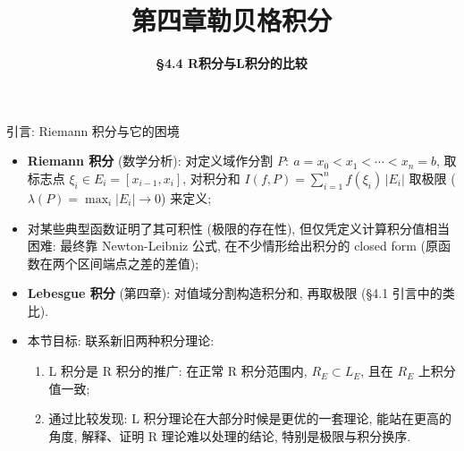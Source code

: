 


\title[第四章\\
勒贝格积分]{\texorpdfstring{\LARGE \bfseries 第四章\quad 勒贝格积分}{第四章 勒贝格积分}} %
\author[\S 4.4\\
R积分与L积分] %
{\Large \bfseries \S 4.4 R积分与L积分的比较}
\date{}





\begin{frame}

\titlepage

\end{frame}




\begin{frame}{引言: Riemann 积分与它的困境}

\begin{itemize}
\item \textbf{Riemann 积分} (数学分析): 对定义域作分割 $P:\ a = x_0 < x_1 < \cdots < x_n = b$,
  取标志点 $\xi_i \in E_i = [x_{i-1}, x_i]$, 对\alert{积分和}
  $I(f, P) = \sum_{i=1}^{n} f(\xi_i)\, |E_i|$ 取极限 ($\lambda(P) = \max_i |E_i| \to 0$) 来定义;
\item 对某些典型函数证明了其可积性 (极限的存在性), 但仅凭定义\alert{计算积分值}相当困难:
  最终靠 Newton-Leibniz 公式, 在不少情形给出积分的 closed form
  (原函数在两个区间端点之差的差值);
\item \textbf{Lebesgue 积分} (第四章): 对\alert{值域}分割构造积分和, 再取极限
  (\S 4.1 引言中的类比).
\end{itemize}

\pause

\begin{itemize}
\item 本节目标: 联系新旧两种积分理论:
  \begin{enumerate}
  \item L 积分是 R 积分的\alert{推广}: 在正常 R 积分范围内, $R_E \subset L_E$, 且在 $R_E$ 上积分值一致;
  \item 通过比较发现: L 积分理论在大部分时候是更优的一套理论, 能站在更高的角度,
    解释、证明 R 理论\alert{难以处理}的结论, 特别是\alert{极限与积分换序}.
  \end{enumerate}
\end{itemize}

\end{frame}

